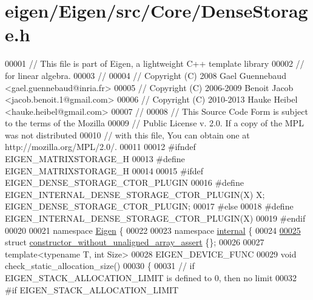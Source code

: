 \hypertarget{eigen_2_eigen_2src_2_core_2_dense_storage_8h_source}{}\section{eigen/\+Eigen/src/\+Core/\+Dense\+Storage.h}
\label{eigen_2_eigen_2src_2_core_2_dense_storage_8h_source}

\begin{DoxyCode}
00001 \textcolor{comment}{// This file is part of Eigen, a lightweight C++ template library}
00002 \textcolor{comment}{// for linear algebra.}
00003 \textcolor{comment}{//}
00004 \textcolor{comment}{// Copyright (C) 2008 Gael Guennebaud <gael.guennebaud@inria.fr>}
00005 \textcolor{comment}{// Copyright (C) 2006-2009 Benoit Jacob <jacob.benoit.1@gmail.com>}
00006 \textcolor{comment}{// Copyright (C) 2010-2013 Hauke Heibel <hauke.heibel@gmail.com>}
00007 \textcolor{comment}{//}
00008 \textcolor{comment}{// This Source Code Form is subject to the terms of the Mozilla}
00009 \textcolor{comment}{// Public License v. 2.0. If a copy of the MPL was not distributed}
00010 \textcolor{comment}{// with this file, You can obtain one at http://mozilla.org/MPL/2.0/.}
00011 
00012 \textcolor{preprocessor}{#ifndef EIGEN\_MATRIXSTORAGE\_H}
00013 \textcolor{preprocessor}{#define EIGEN\_MATRIXSTORAGE\_H}
00014 
00015 \textcolor{preprocessor}{#ifdef EIGEN\_DENSE\_STORAGE\_CTOR\_PLUGIN}
00016 \textcolor{preprocessor}{  #define EIGEN\_INTERNAL\_DENSE\_STORAGE\_CTOR\_PLUGIN(X) X; EIGEN\_DENSE\_STORAGE\_CTOR\_PLUGIN;}
00017 \textcolor{preprocessor}{#else}
00018 \textcolor{preprocessor}{  #define EIGEN\_INTERNAL\_DENSE\_STORAGE\_CTOR\_PLUGIN(X)}
00019 \textcolor{preprocessor}{#endif}
00020 
00021 \textcolor{keyword}{namespace }\hyperlink{namespace_eigen}{Eigen} \{
00022 
00023 \textcolor{keyword}{namespace }\hyperlink{namespaceinternal}{internal} \{
00024 
\hyperlink{struct_eigen_1_1internal_1_1constructor__without__unaligned__array__assert}{00025} \textcolor{keyword}{struct }\hyperlink{struct_eigen_1_1internal_1_1constructor__without__unaligned__array__assert}{constructor\_without\_unaligned\_array\_assert} \{\};
00026 
00027 \textcolor{keyword}{template}<\textcolor{keyword}{typename} T, \textcolor{keywordtype}{int} Size>
00028 EIGEN\_DEVICE\_FUNC
00029 \textcolor{keywordtype}{void} check\_static\_allocation\_size()
00030 \{
00031   \textcolor{comment}{// if EIGEN\_STACK\_ALLOCATION\_LIMIT is defined to 0, then no limit}
00032 \textcolor{preprocessor}{  #if EIGEN\_STACK\_ALLOCATION\_LIMIT}

\end{DoxyCode}
